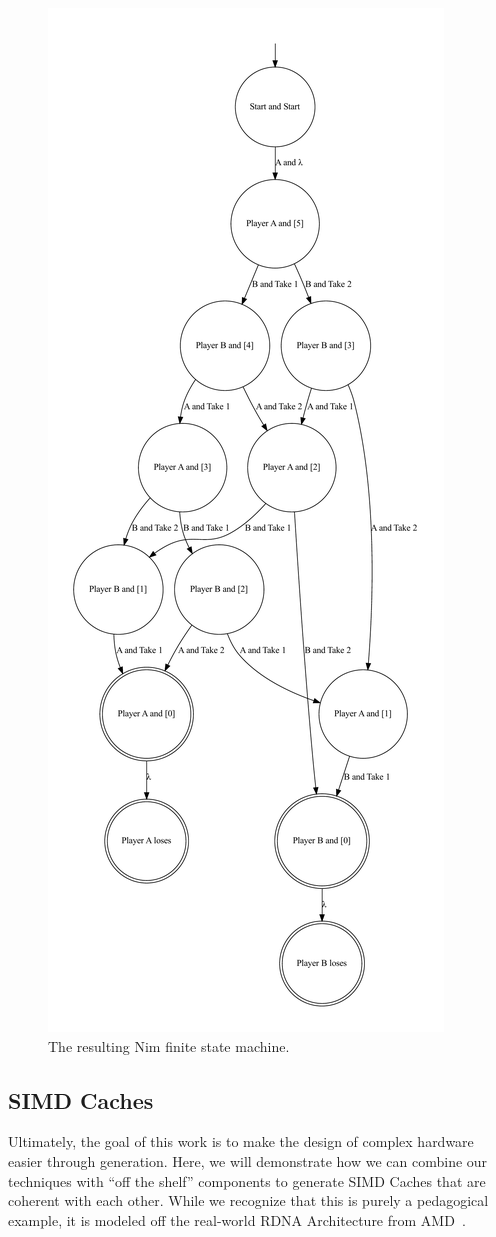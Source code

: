\documentclass[sigplan,anonymous,review]{acmart}
\begin{document}
\begin{figure}
    \centering
    \includegraphics[width=0.6\linewidth]{figures/nimexample/nimFSM.pdf}
    \caption{The resulting Nim finite state machine.}
    \label{fig:nimFSM}
\end{figure}

\subsection{SIMD Caches}\label{sec:cache}
Ultimately, the goal of this work is to make the design of complex hardware easier through generation. Here, we will demonstrate how we can combine our techniques with ``off the shelf'' components to generate SIMD Caches that are coherent with each other. While we recognize that this is purely a pedagogical example, it is modeled off the real-world RDNA Architecture from AMD~\cite{}.
\end{document}

